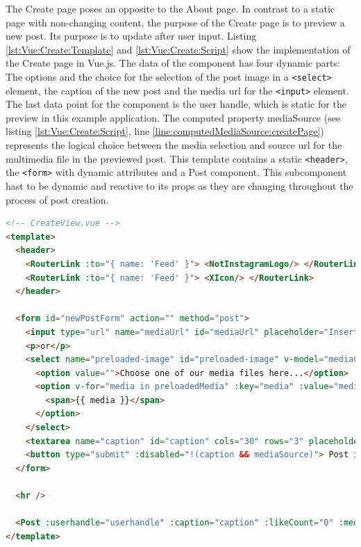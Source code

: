 \documentclass[a4paper, 10pt]{article}
\begin{document}
The Create page poses an opposite to the About page.
In contrast to a static page with non-changing content, the purpose of the Create page is to preview a new post.
Its purpose is to update after user input.
Listing \ref{lst:Vue:Create:Template} and \ref{lst:Vue:Create:Script} show the implementation of the Create page in Vue.js.
The data of the component has four dynamic parts: The options and the choice for the selection of the post image in a \verb|<select>| element, the caption of the new post and the media \acrshort{url} for the \verb|<input>| element.
The last data point for the component is the user handle, which is static for the preview in this example application.
The computed property mediaSource (see listing \ref{lst:Vue:Create:Script}, line \ref{line:computedMediaSource:createPage}) represents the logical choice between the media selection and source \acrshort{url} for the multimedia file in the previewed post.
This template contains a static \verb|<header>|, the \verb|<form>| with dynamic attributes and a Post component.
This subcomponent hast to be dynamic and reactive to its props as they are changing throughout the process of post creation.

\begin{lstlisting}[caption=Create Page in Vue.js (Template), label={lst:Vue:Create:Template}, language=HTML]
<!-- CreateView.vue -->
<template>
  <header>
    <RouterLink :to="{ name: 'Feed' }"> <NotInstagramLogo/> </RouterLink>
    <RouterLink :to="{ name: 'Feed' }"> <XIcon/> </RouterLink>
  </header>

  <form id="newPostForm" action="" method="post">
    <input type="url" name="mediaUrl" id="mediaUrl" placeholder="Insert your media URL here..." v-model="mediaUrl" />
    <p>or</p>
    <select name="preloaded-image" id="preloaded-image" v-model="mediaChoice">
      <option value="">Choose one of our media files here...</option>
      <option v-for="media in preloadedMedia" :key="media" :value="media">
        <span>{{ media }}</span>
      </option>
    </select>
    <textarea name="caption" id="caption" cols="30" rows="3" placeholder="Type your caption here" v-model="caption"/>
    <button type="submit" :disabled="!(caption && mediaSource)"> Post it! </button>
  </form>

  <hr />

  <Post :userhandle="userhandle" :caption="caption" :likeCount="0" :mediaSource="mediaSource" :hideActionIcons="true" />
</template>
\end{lstlisting}
\end{document}
